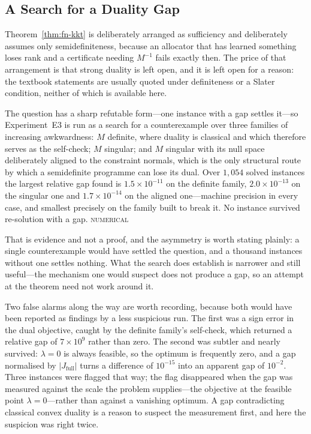 \documentclass[conference]{IEEEtran}
\theoremstyle{definition}
\newcommand{\NUM}{\textsc{numerical}}
\begin{document}
\subsection{A Search for a Duality Gap}
\label{sec:fn-e3results}

Theorem~\ref{thm:fn-kkt} is deliberately arranged as sufficiency and deliberately assumes only
semidefiniteness, because an allocator that has learned something loses rank and a certificate
needing $M^{-1}$ fails exactly then. The price of that arrangement is that strong duality is
left open, and it is left open for a reason: the textbook statements are usually quoted under
definiteness or a Slater condition, neither of which is available here.

The question has a sharp refutable form---one instance with a gap settles it---so
Experiment~E3 is run as a search for a counterexample over three families of increasing
awkwardness: $M$ definite, where duality is classical and which therefore serves as the
self-check; $M$ singular; and $M$ singular with its null space deliberately aligned to the
constraint normals, which is the only structural route by which a semidefinite programme can
lose its dual. Over $1{,}054$ solved instances the largest relative gap found is
$1.5\times10^{-11}$ on the definite family, $2.0\times10^{-13}$ on the singular one and
$1.7\times10^{-14}$ on the aligned one---machine precision in every case, and smallest
precisely on the family built to break it. No instance survived re-solution with a gap.
\NUM{}

That is evidence and not a proof, and the asymmetry is worth stating plainly: a single
counterexample would have settled the question, and a thousand instances without one settles
nothing. What the search does establish is narrower and still useful---the mechanism one would
suspect does not produce a gap, so an attempt at the theorem need not work around it.

Two false alarms along the way are worth recording, because both would have been reported as
findings by a less suspicious run. The first was a sign error in the dual objective, caught by
the definite family's self-check, which returned a relative gap of $7\times10^{9}$ rather than
zero. The second was subtler and nearly survived: $\lambda=0$ is always feasible, so the
optimum is frequently zero, and a gap normalised by $|J_{\mathrm{full}}|$ turns a difference of
$10^{-15}$ into an apparent gap of $10^{-2}$. Three instances were flagged that way; the flag
disappeared when the gap was measured against the scale the problem supplies---the objective at
the feasible point $\lambda=0$---rather than against a vanishing optimum. A gap contradicting
classical convex duality is a reason to suspect the measurement first, and here the suspicion
was right twice.
\end{document}
